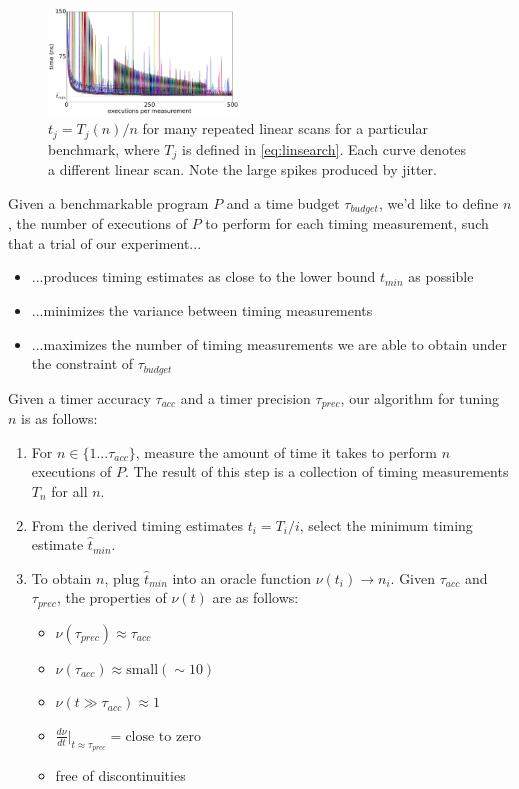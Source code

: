 \documentclass[conference]{IEEEtran}
\begin{document}
\begin{figure}
\centering
\includegraphics[width=0.45\textwidth]{figures/fig2/linear_scan_branchsum}
\caption{$t_j = T_j(n)/n$ for many repeated linear scans for a particular benchmark,
         where $T_j$ is defined in \eqref{eq:linsearch}. Each curve denotes a different
         linear scan. Note the large spikes produced by jitter.}
\label{fig:scaling}
\end{figure}

Given a benchmarkable program $P$ and a time budget $\tau_{budget}$, we'd like to define
$n$, the number of executions of $P$ to perform for each timing measurement, such that a
trial of our experiment...

\begin{itemize}
    \item ...produces timing estimates as close to the lower bound $t_{min}$ as possible
    \item ...minimizes the variance between timing measurements
    \item ...maximizes the number of timing measurements we are able to obtain under the
    constraint of $\tau_{budget}$
\end{itemize}

Given a timer accuracy $\tau_{acc}$ and a timer precision $\tau_{prec}$, our algorithm for
tuning $n$ is as follows:

\begin{enumerate}
    \item For $n \in \{1...\tau_{acc}\}$, measure the amount of time it takes to perform $n$
    executions of $P$. The result of this step is a collection of timing measurements $T_n$
    for all $n$.
    \item From the derived timing estimates $t_i = T_i / i$, select the minimum timing
    estimate $\hat{t}_{min}$.
    \item To obtain $n$, plug $\hat{t}_{min}$ into an oracle function $\nu(t_i) \to n_i$.
    Given $\tau_{acc}$ and $\tau_{prec}$, the properties of $\nu(t)$ are as follows:
    \begin{itemize}
        \item $\nu(\tau_{prec}) \approx \tau_{acc}$
        \item $\nu(\tau_{acc}) \approx \text{small} (\sim 10)$
        \item $\nu(t \gg \tau_{acc}) \approx 1$
        \item $\frac{d\nu}{dt}\big|_{t \approx \tau_{prec}} = \text{close to zero}$
        \item free of discontinuities 
    \end{itemize}
\end{enumerate}
\end{document}
